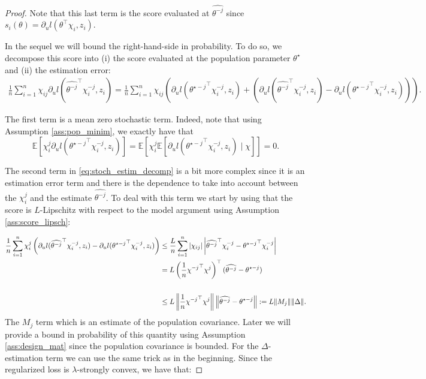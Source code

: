 \documentclass{article}
\theoremstyle{plain}
\theoremstyle{definition}
\theoremstyle{remark}
\newcommand{\e}[1]{\mathbb{E}\left[#1\right]  } %
\begin{document}
\begin{proof}
 Note that this last term is the score evaluated at $\widehat{\theta^{-j}}$ since $s_i(\theta)=\partial_u l(\theta^\top \chi_i, z_i).$    

 In the sequel we will bound the right-hand-side in probability. To do so, we decompose this score into (i) the score evaluated at the population parameter $\theta^\star$ and (ii) the estimation error:
 \begin{align}\label{eq:stoch_estim_decomp}
     \frac{1}{n}\sum_{i=1}^n \chi_{ij}\partial_u l(\widehat{\theta^{-j}}^\top \chi_i^{-j}, z_i)=\frac{1}{n}\sum_{i=1}^n \chi_{ij}\left(\partial_u l({\theta^{\star -j}}^\top \chi_i^{-j}, z_i)+\left(\partial_u l(\widehat{\theta^{-j}}^\top \chi_i^{-j}, z_i)-\partial_u l({\theta^{\star -j}}^\top \chi_i^{-j}, z_i)\right)\right).
 \end{align}

The first term is a mean zero stochastic term. Indeed, note that using Assumption \ref{ass:pop_minim}, we exactly have that $$\e{\chi_i^j\partial_u l({\theta^{\star-j}}^\top \chi^{-j}_i, z_i)}=\e{\chi_i^j\e{\partial_u l({\theta^{\star-j}}^\top \chi^{-j}_i, z_i)\mid \chi}}=0.$$

The second term in \eqref{eq:stoch_estim_decomp} is a bit more complex since it is an estimation error term and there is the dependence to take into account between the $\chi_i^j$ and the estimate $\widehat{\theta^{-j}}$. To deal with this term we start by using that the score is $L$-Lipschitz with respect to the model argument using Assumption \ref{ass:score_lipsch}:

\begin{align}
    \frac{1}{n}\sum_{i=1}^n \chi_{i}^j\left(\partial_u l(\widehat{\theta^{-j}}^\top \chi_i^{-j}, z_i)-\partial_u l({\theta^{\star -j}}^\top \chi_i^{-j}, z_i)\right)&\leq \frac{L}{n}\sum_{i=1}^n |\chi_{ij}|\left|\widehat{\theta^{-j}}^\top \chi_i^{-j}-{\theta^{\star -j}}^\top \chi_i^{-j}\right|\notag
     \\&=L\left(\frac{1}{n}{\chi^{-j}}^\top \chi^j\right)^\top (\widehat{\theta^{-j}}-\theta^{\star-j})\notag\\
    \\&\leq L\left\|\frac{1}{n}{\chi^{-j}}^\top \chi^j\right\| \left\|\widehat{\theta^{-j}}-\theta^{\star-j}\right\|:=L\|M_j\| \|\Delta\|. \label{eq:estim_M_delta}
\end{align}
The $M_j$ term which is an estimate of the population covariance. Later we will provide a bound in probability of this quantity using Assumption \ref{ass:design_mat} since the population covariance is bounded.
For the $\Delta$-estimation term we can use the same trick as in the beginning. Since the regularized loss is $\lambda$-strongly convex, we have that:


\end{proof}
\end{document}
